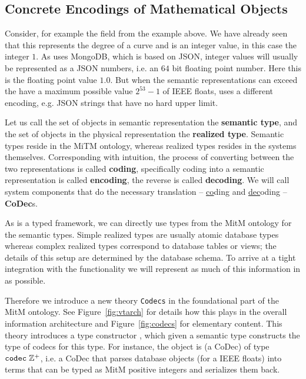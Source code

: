 \subsection{Concrete Encodings of Mathematical Objects}\label{sec:vt:translation}


Consider, for example the  field from the example above.  We have
already seen that this represents the degree of a curve and is an integer value, in this
case the integer $1$.  As \lmfdb uses MongoDB, which is based on JSON, integer values will
usually be represented as a JSON numbers, i.e. an  $64$ bit floating
point number.  Here this is the floating point value $1.0$. But when the semantic
representations can exceed the have a maximum possible value $2^{53}-1$ of IEEE floats,
\lmfdb uses a different encoding, e.g. JSON strings that have no hard upper limit.

Let us call the set of objects in semantic representation the \textbf{semantic type}, and
the set of objects in the physical representation the \textbf{realized type}.  Semantic
types reside in the MiTM ontology, whereas realized types resides in the systems
themselves. Corresponding with intuition, the process of converting between the two
representations is called \textbf{coding}, specifically coding into a semantic
representation is called \textbf{encoding}, the reverse is called \textbf{decoding}. We
will call system components that do the necessary translation -- \underline{co}ding and
\underline{dec}oding -- \textbf{CoDec}s. 

As \ommt is a typed framework, we can directly use \ommt types from the MitM ontology for
the semantic types. Simple realized types are usually atomic database types whereas
complex realized types correspond to database tables or views; the details of this setup
are determined by the database schema. To arrive at a tight integration with the \ommt
functionality we will represent as much of this information in \ommt as possible.

Therefore we introduce a new \ommt theory \texttt{Codecs} in the foundational part of the
MitM ontology. See Figure~\ref{fig:vtarch} for details how this plays in the overall
information architecture and Figure~\ref{fig:codecs} for elementary content. This theory
introduces a type constructor \codectt, which given a semantic type constructs the type of
codecs for this type. For instance, the object  is (a CoDec) of
type $\codectt\;\mathbb{Z}^+$, i.e. a CoDec that parses database objects (for \lmfdb a
IEEE floats) into \ommt terms that can be typed as MitM positive integers and serializes
them back.

